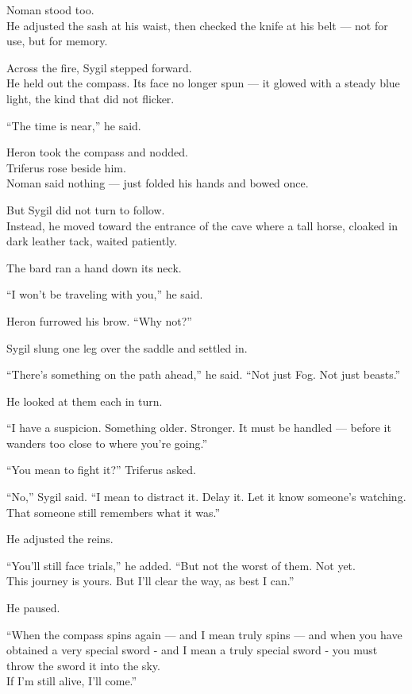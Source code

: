 \documentclass[9pt]{article}
\begin{document}
Noman stood too.\\
He adjusted the sash at his waist, then checked the knife at his belt — not for use, but for memory.

Across the fire, Sygil stepped forward.\\
He held out the compass. Its face no longer spun — it glowed with a steady blue light, the kind that did not flicker.

\vspace{1em}

“The time is near,” he said.

Heron took the compass and nodded.\\
Triferus rose beside him.\\
Noman said nothing — just folded his hands and bowed once.

\vspace{1em}

But Sygil did not turn to follow.\\
Instead, he moved toward the entrance of the cave where a tall horse, cloaked in dark leather tack, waited patiently.

The bard ran a hand down its neck.

“I won’t be traveling with you,” he said.

Heron furrowed his brow. “Why not?”

Sygil slung one leg over the saddle and settled in.

“There’s something on the path ahead,” he said. “Not just Fog. Not just beasts.”

He looked at them each in turn.

“I have a suspicion. Something older. Stronger. It must be handled — before it wanders too close to where you’re going.”

“You mean to fight it?” Triferus asked.

“No,” Sygil said. “I mean to distract it. Delay it. Let it know someone’s watching.\\
That someone still remembers what it was.”

\vspace{1em}

He adjusted the reins.

“You’ll still face trials,” he added. “But not the worst of them. Not yet.\\
This journey is yours. But I’ll clear the way, as best I can.”

He paused.

“When the compass spins again — and I mean truly spins — and when you have obtained a very special sword - and I mean a truly special sword - you must throw the sword it into the sky.\\
If I’m still alive, I’ll come.”
\end{document}
